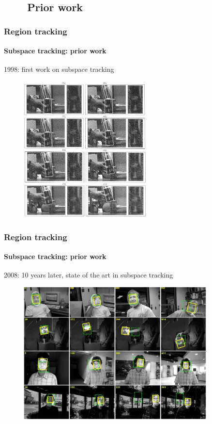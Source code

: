\subsection{\ \ \ \ Prior work}

\begin{frame}
\frametitle{Region tracking}
\framesubtitle{Subspace tracking: prior work}
\mypagenum{}
\vspace{0.1in}
1998: first work on subspace tracking
	\begin{figure}
		\includegraphics[width=0.6\textwidth]{figs/TrackingPapers_SubspaceTracking_1998_Black_fig9.png}
	\end{figure}
\end{frame}


\begin{frame}
\frametitle{Region tracking}
\framesubtitle{Subspace tracking: prior work}
\logoCSIPCPL\mypagenum
\vspace{0.1in}
2008: 10 years later, state of the art in subspace tracking
\begin{figure}
\includegraphics[width=0.9\textwidth]{figs/TrackingPapers_SubspaceTracking_2008_Ross_fig10.png}
\end{figure}
\end{frame}





